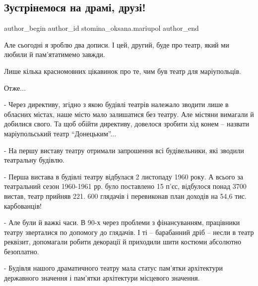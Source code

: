 
 
 
 
 

\subsection{Зустрінемося на драмі, друзі!}
\label{sec:16_03_2023.fb.stomina_oksana.mariupol.1.zustrinemos_na_drami_druzi}

\ifcmt
 author_begin
   author_id stomina_oksana.mariupol
 author_end
\fi

Але сьогодні я зроблю два дописи. І цей, другий, буде про театр, який ми любили
й пам'ятатимемо завжди. 

Лише кілька красномовних цікавинок про те, чим був театр для маріупольців.

Отже...

- Через директиву, згідно з якою будівлі театрів належало зводити лише в
обласних містах, наше місто мало залишатися без театру. Але містяни вимагали й
добилися свого. Та щоб обійти директиву, довелося зробити хід конем – назвати
маріупольський театр \enquote{Донецьким}...

- На першу виставу театру отримали запрошення всі будівельники, які зводили
театральну будівлю.

- Перша вистава в будівлі театру відбулася 2 листопаду 1960 року. А всього за
театральний сезон 1960-1961 рр. було поставлено 15 п'єс, відбулося понад 3700
вистав, театр прийняв 221. 600 глядачів і перевиконав план доходів на 54,6
тис. карбованців! 

-  Але були й важкі часи. В 90-х через проблеми з фінансуванням, працівники
театру зверталися по допомогу до глядачів. І ті – барабанний дріб – несли в
театр реквізит, допомагали робити декорації й приходили шити костюми абсолютно
безоплатно.

- Будівля нашого драматичного театру мала статус пам'ятки архітектури
державного значення і пам'ятки архітектури місцевого значення.

